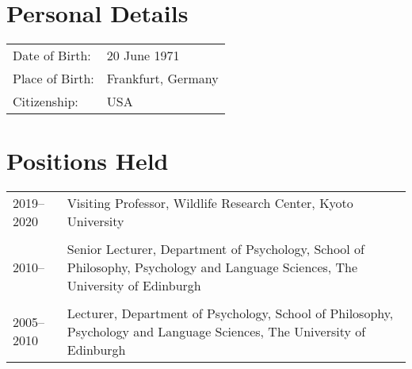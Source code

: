 \documentclass[11pt]{article}
\begin{document}

\noindent{\rule{\textwidth}{1pt}} \\


\section*{Personal Details}
\begin{tabular}{p{3cm}p{12cm}}
Date of Birth: & 20 June 1971 \\
Place of Birth: & Frankfurt, Germany \\
Citizenship: & USA
\end{tabular}

\section*{Positions Held}

\begin{tabular}{p{3cm}p{12cm}}
2019--2020 & Visiting Professor, Wildlife Research Center, Kyoto University \\ \\

2010-- & Senior Lecturer, Department of Psychology, School of
Philosophy, Psychology and Language Sciences, The University of
Edinburgh \\ \\

2005--2010 & Lecturer, Department of Psychology, School of
Philosophy, Psychology and Language Sciences, The University of
Edinburgh 
\end{tabular}
\end{document}
